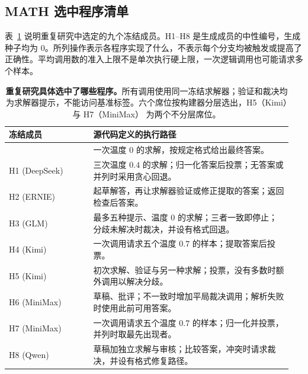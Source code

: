 \subsection{MATH 选中程序清单}
\label{app:panel-mechanisms}
表~\ref{tab:panel-mechanisms} 说明重复研究中选定的九个冻结成员。H1--H8 是生成成员的中性编号，生成种子均为 $0$。所列操作表示各程序实现了什么，不表示每个分支均被触发或提高了正确性。平均调用数的准入上限不是单次执行硬上限，一次逻辑调用也可能请求多个样本。

\begin{table}[htbp]
\centering\small
\begin{tabular}{@{}p{0.29\linewidth}p{0.66\linewidth}@{}}
\toprule
冻结成员 & 源代码定义的执行路径 \\
\midrule
\bare{} & 一次温度 $0$ 的求解，按规定格式给出最终答案。 \\
H1 (DeepSeek) & 三次温度 $0.4$ 的求解；归一化答案后投票；无答案或并列时采用贪心回退。 \\
H2 (ERNIE) & 起草解答，再让求解器验证或修正提取的答案；返回检查后答案。 \\
H3 (GLM) & 最多五种提示、温度 $0$ 的求解；三者一致即停止；分歧未解决时裁决，并设有格式回退。 \\
H4 (Kimi) & 一次调用请求五个温度 $0.7$ 的样本；提取答案后投票。 \\
H5 (Kimi) & 初次求解、验证与另一种求解；投票，没有多数时额外调用以解决分歧。 \\
H6 (MiniMax) & 草稿、批评；不一致时增加平局裁决调用；解析失败时使用此前可用答案。 \\
H7 (MiniMax) & 一次调用请求五个温度 $0.7$ 的样本；归一化并投票，并列时取最先出现者。 \\
H8 (Qwen) & 草稿加独立求解与审核；比较答案，冲突时请求裁决，并设有格式修复路径。 \\
\bottomrule
\end{tabular}
\caption{\textbf{重复研究具体选中了哪些程序。}所有调用使用同一冻结求解器；验证和裁决均为求解器提示，不能访问基准标签。六个席位按构建器分层选出，H5（Kimi）与 H7（MiniMax） 为两个不分层席位。}
\label{tab:panel-mechanisms}
\end{table}
